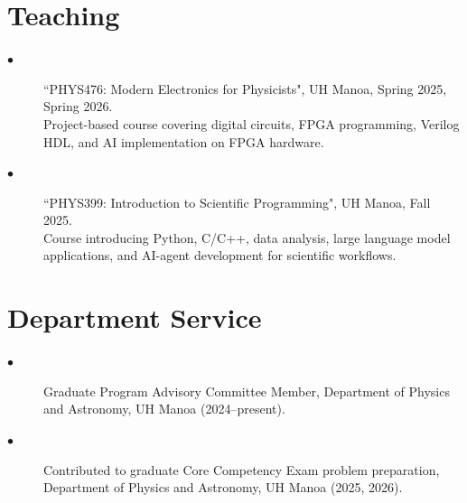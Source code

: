 \documentclass[12pt]{article}
\begin{document}
{%
\section*{\large{Teaching}} 
{\footnotesize
\begin{description}
\item[$\bullet$]  {``PHYS476: Modern Electronics for Physicists", UH Manoa, Spring 2025, Spring 2026. \\
\hspace{-0.25in}
Project-based course covering digital circuits, FPGA programming, Verilog HDL, and AI implementation on FPGA hardware.}
\item[$\bullet$]  {``PHYS399: Introduction to Scientific Programming", UH Manoa, Fall 2025. \\
\hspace{-0.25in}
Course introducing Python, C/C++, data analysis, large language model applications, and AI-agent development for scientific workflows.}
\end{description}
}

\section*{\large{Department Service}} 
{\footnotesize
\begin{description}
\item[$\bullet$] {Graduate Program Advisory Committee Member, Department of Physics and Astronomy, UH Manoa (2024--present).}
\item[$\bullet$] {Contributed to graduate Core Competency Exam problem preparation, Department of Physics and Astronomy, UH Manoa (2025, 2026).}
\end{description}
}

}
\end{document}
